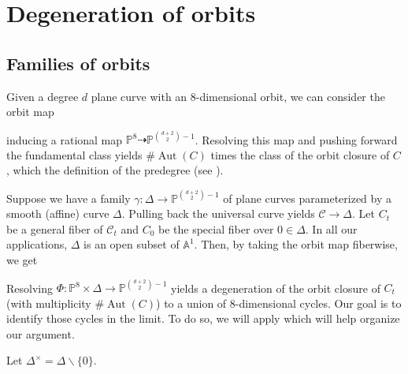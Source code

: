 \documentclass{article}
\theoremstyle{definition}
\newcommand{\on}{\operatorname}
\newcommand{\mb}{\mathbb}
\newcommand{\mc}{\mathcal}
\begin{document}
\section{Degeneration of orbits}
\label{degenerationsection}

\subsection{Families of orbits}
Given a degree $d$ plane curve with an 8-dimensional orbit, we can consider the orbit map
\begin{center}
\end{center}
inducing a rational map $\mb{P}^8\dashrightarrow \mb{P}^{\binom{d+2}{2}-1}$. Resolving this map and pushing forward the fundamental class yields $\#\on{Aut}(C)$ times the class of the orbit closure of $C$, which the definition of the predegree (see ). 

Suppose we have a family $\gamma: \Delta\to \mb{P}^{\binom{d+2}{2}-1}$ of plane curves parameterized by a smooth (affine) curve $\Delta$. Pulling back the universal curve yields $\mc{C}\to \Delta$. Let $C_t$ be a general fiber of $\mc{C}_t$ and $C_0$ be the special fiber over $0\in \Delta$. In all our applications, $\Delta$ is an open subset of $\mb{A}^1$. Then, by taking the orbit map fiberwise, we get
\begin{center}
\end{center}
Resolving $\Phi: \mb{P}^8\times\Delta\to \mb{P}^{\binom{d+2}{2}-1}$ yields a degeneration of the orbit closure of $C_t$ (with multiplicity $\#\on{Aut}(C)$) to a union of 8-dimensional cycles. Our goal is to identify those cycles in the limit. To do so, we will apply  which will help organize our argument. 

Let $\Delta^{\times}=\Delta\backslash\{0\}$.
\end{document}

